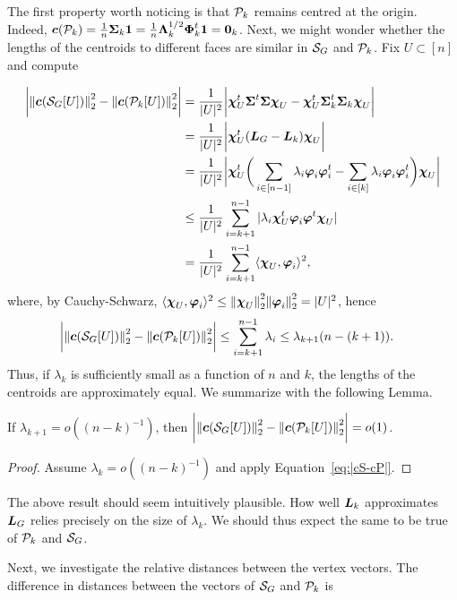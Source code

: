 The first property worth noticing is that $\P_k$ remains  centred at the  origin. Indeed,  $\cent(\P_k) = \frac{1}{n}\Sv_k\one = \frac{1}{n}\Eval_k^{1/2}\Eig_k^\tp\one=\zero_k$.  Next, we might wonder  whether the lengths of the  centroids to different faces  are similar in $\splx_G$ and $\P_k$. Fix  $U\subset [n]$ and compute 

\begin{align*}
\bigg|\norm{\cent(\splx_G[U])}_2^2 - \norm{\cent(\P_k[U])}_2^2\bigg| &= \frac{1}{|U|^2}\bigg| \bchi_U^\tp \Sv^\tp\Sv\bchi_U - \bchi_U^\tp \Sv_k^\tp\Sv_k\bchi_U \bigg| \\
&= \frac{1}{|U|^2} \bigg|\bchi_U^\tp (\L_G-\L_k)\bchi_U\bigg| \\
&=  \frac{1}{|U|^2} \bigg|\bchi_U^\tp \bigg( \sum_{i\in[n-1]}\lambda_i\vp_i\vp_i^\tp - \sum_{i\in[k]}\lambda_i\vp_i\vp_i^\tp\bigg)\bchi_U\bigg|\\
&\leq  \frac{1}{|U|^2} \sum_{i=k+1}^{n-1}|\lambda_i \bchi_U^\tp \vp_i\vp^\tp\bchi_U |\\
&=   \frac{1}{|U|^2} \sum_{i=k+1}^{n-1}\la \bchi_U,\vp_i\ra^2,
\end{align*}
where, by Cauchy-Schwarz, $\la \bchi_U,\vp_i\ra^2 \leq \norm{\bchi_U}_2^2 \norm{\vp_i}_2^2 = |U|^2$, 
hence  
\begin{align}
\bigg|\norm{\cent(\splx_G[U])}_2^2 - \norm{\cent(\P_k[U])}_2^2\bigg| &\leq \sum_{i=k+1}^{n-1}  \lambda_i  \leq \lambda_{k+1} (n-(k+1)). \label{eq:|cS-cP|}
\end{align}
Thus, if $\lambda_k$ is sufficiently small as a function  of $n$ and $k$, the lengths of the centroids are approximately equal. We summarize with  the following Lemma. 

\begin{lemma}
	If $\lambda_{k+1} = o((n-k)^{-1})$, then  $ \bigg|\norm{\cent(\splx_G[U])}_2^2 - \norm{\cent(\P_k[U])}_2^2\bigg| = o(1)$. 
\end{lemma}
\begin{proof}
	Assume $\lambda_k = o((n-k)^{-1})$ and apply Equation~\eqref{eq:|cS-cP|}. 
\end{proof}

\begin{remark}
	The  above result should seem intuitively plausible.  How  well $\L_k$ approximates $\L_G$ relies precisely on the size of $\lambda_k$. We should  thus expect  the same to be  true  of $\P_k$ and  $\splx_G$. 
\end{remark}

Next, we  investigate the relative distances between  the vertex vectors. The difference  in distances  between the vectors of $\splx_G$ and $\P_k$ is 

